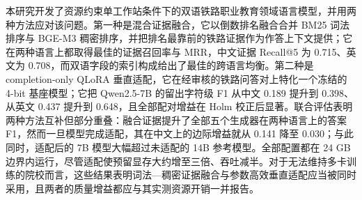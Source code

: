 \documentclass{article}
\begin{document}
本研究开发了资源约束单工作站条件下的双语铁路职业教育领域语言模型，并用两种方法应对该问题。第一种是混合证据融合，它以倒数排名融合合并 BM25 词法排序与 BGE-M3 稠密排序，并把排名最靠前的铁路证据作为作答上下文提供；它在两种语言上都取得最佳的证据召回率与 MRR，中文证据 Recall@5 为 0.715、英文为 0.708，而双语字段的索引构成给出了最佳的跨语言均衡。第二种是 completion-only QLoRA 垂直适配，它在经审核的铁路问答对上特化一个冻结的 4-bit 基座模型；它把 Qwen2.5-7B 的留出字符级 F1 从中文 0.189 提升到 0.398、从英文 0.437 提升到 0.648，且全部配对增益在 Holm 校正后显著。联合评估表明两种方法互补但部分重叠：融合证据提升了全部五个生成器在两种语言上的答案 F1，然而一旦模型完成适配，其在中文上的边际增益就从 0.141 降至 0.030；与此同时，适配后的 7B 模型大幅超过未适配的 14B 参考模型。全部配置都在 24 GB 边界内运行，尽管适配使预留显存大约增至三倍、吞吐减半。对于无法维持多卡训练的院校而言，这些结果表明词法—稠密证据融合与参数高效垂直适配应当被同时采用，且两者的质量增益都应与其实测资源开销一并报告。
\end{document}
